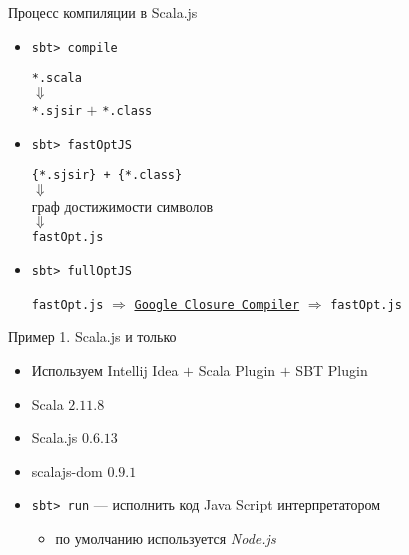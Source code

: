 \begin{frame}{Процесс компиляции в Scala.js}
	\begin{itemize}
		\item[] \alert{\texttt{sbt> compile}}
		\begin{center}
		\begin{small}
			\texttt{*.scala}\\ 
			$\Downarrow$ \\ 
			\texttt{*.sjsir} $+$ \texttt{*.class}
		\end{small}
		\end{center}
		\item[] \alert{\texttt{sbt> fastOptJS}}
		\begin{center}
		\begin{small}
			\texttt{\{*.sjsir\} + \{*.class\}}  \\ 
            $\Downarrow$ \\
            граф достижимости символов \\
            $\Downarrow$ \\
            \texttt{fastOpt.js}
        \end{small}
		\end{center}
		\item[] \alert{\texttt{sbt> fullOptJS}}
		\begin{center}
		\begin{small}
			\texttt{fastOpt.js} $\Rightarrow$ \texttt{\href{https://github.com/google/closure-compiler}{Google Closure Compiler}} $\Rightarrow$ \texttt{fastOpt.js}
        \end{small}
		\end{center}
	\end{itemize}
\end{frame}

\begin{frame}{Пример 1. Scala.js и только}
\begin{itemize}
	\item Используем \alert{Intellij Idea} $+$ \alert{Scala Plugin} $+$ \alert{SBT Plugin}
	\item Scala $2.11.8$
	\item Scala.js $0.6.13$
	\item scalajs-dom $0.9.1$
\end{itemize}
\begin{itemize}
	\item \alert{\texttt{sbt> run}} --- исполнить код Java Script интерпретатором
	\begin{itemize}
		\item по умолчанию используется \emph{Node.js}
	\end{itemize}
\end{itemize}
\end{frame}

